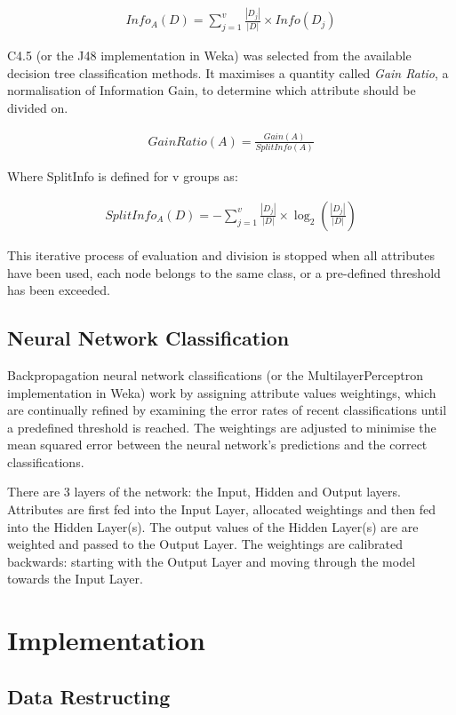\documentclass[10pt, a4paper]{article}
\begin{document}
\begin{align*}
	Info_A(D) = \sum^{v}_{j=1}\frac{|D_j|}{|D|} \times Info(D_j)
\end{align*}


C4.5 (or the J48 implementation in Weka) was selected from the available decision tree classification methods. It maximises a quantity called \textit{Gain Ratio}, a normalisation of Information Gain, to determine which attribute should be divided on.

\begin{align*}
	Gain Ratio(A) = \frac{Gain(A)}{SplitInfo(A)}
\end{align*}

Where SplitInfo is defined for v groups as:

\begin{align*}
	SplitInfo_A(D) = - \sum^{v}_{j=1}\frac{|D_j|}{|D|} \times \log_2(\frac{|D_j|}{|D|})
\end{align*}

This iterative process of evaluation and division is stopped when all attributes have been used, each node belongs to the same class, or a pre-defined threshold has been exceeded.

\subsection*{Neural Network Classification}

Backpropagation neural network classifications (or the MultilayerPerceptron implementation in Weka) work by assigning attribute values weightings, which are continually refined by examining the error rates of recent classifications until a predefined threshold is reached. The weightings are adjusted to minimise the mean squared error between the neural network's predictions and the correct classifications.

There are 3 layers of the network: the Input, Hidden and Output layers. Attributes are first fed into the Input Layer, allocated weightings and then fed into the Hidden Layer(s). The output values of the Hidden Layer(s) are are weighted and passed to the Output Layer. The weightings are calibrated backwards: starting with the Output Layer and moving through the model towards the Input Layer.

\section*{Implementation}

\subsection*{Data Restructing}
\end{document}
